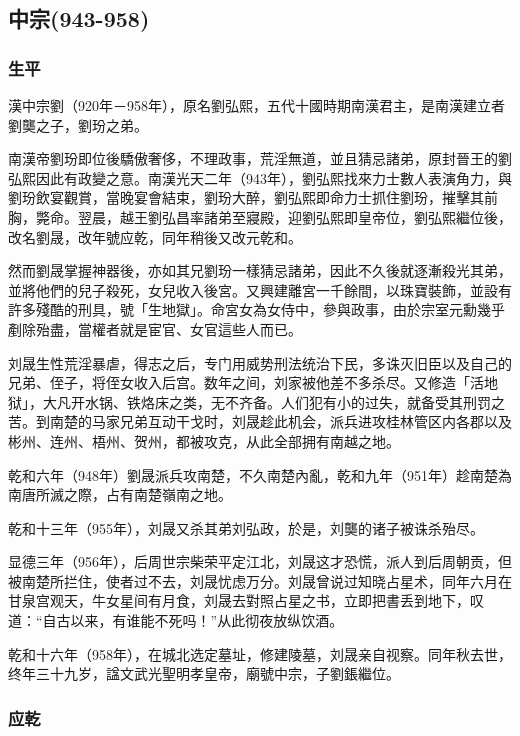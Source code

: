 
\subsection{中宗\tiny(943-958)}

\subsubsection{生平}

漢中宗劉（920年－958年），原名劉弘熙，五代十國時期南漢君主，是南漢建立者劉龑之子，劉玢之弟。

南漢帝劉玢即位後驕傲奢侈，不理政事，荒淫無道，並且猜忌諸弟，原封晉王的劉弘熙因此有政變之意。南漢光天二年（943年），劉弘熙找來力士數人表演角力，與劉玢飲宴觀賞，當晚宴會結束，劉玢大醉，劉弘熙即命力士抓住劉玢，摧擊其前胸，斃命。翌晨，越王劉弘昌率諸弟至寢殿，迎劉弘熙即皇帝位，劉弘熙繼位後，改名劉晟，改年號应乾，同年稍後又改元乾和。

然而劉晟掌握神器後，亦如其兄劉玢一樣猜忌諸弟，因此不久後就逐漸殺光其弟，並將他們的兒子殺死，女兒收入後宮。又興建離宮一千餘間，以珠寶裝飾，並設有許多殘酷的刑具，號「生地獄」。命宮女為女侍中，參與政事，由於宗室元勳幾乎剷除殆盡，當權者就是宦官、女官這些人而已。

刘晟生性荒淫暴虐，得志之后，专门用威势刑法统治下民，多诛灭旧臣以及自己的兄弟、侄子，将侄女收入后宫。数年之间，刘家被他差不多杀尽。又修造「活地狱」，大凡开水锅、铁烙床之类，无不齐备。人们犯有小的过失，就备受其刑罚之苦。到南楚的马家兄弟互动干戈时，刘晟趁此机会，派兵进攻桂林管区内各郡以及彬州、连州、梧州、贺州，都被攻克，从此全部拥有南越之地。

乾和六年（948年）劉晟派兵攻南楚，不久南楚內亂，乾和九年（951年）趁南楚為南唐所滅之際，占有南楚嶺南之地。

乾和十三年（955年），刘晟又杀其弟刘弘政，於是，刘龑的诸子被诛杀殆尽。

显德三年（956年），后周世宗柴荣平定江北，刘晟这才恐慌，派人到后周朝贡，但被南楚所拦住，使者过不去，刘晟忧虑万分。刘晟曾说过知晓占星术，同年六月在甘泉宫观天，牛女星间有月食，刘晟去對照占星之书，立即把書丢到地下，叹道：“自古以来，有谁能不死吗！”从此彻夜放纵饮酒。

乾和十六年（958年），在城北选定墓址，修建陵墓，刘晟亲自视察。同年秋去世，终年三十九岁，諡文武光聖明孝皇帝，廟號中宗，子劉鋹繼位。

\subsubsection{应乾}


